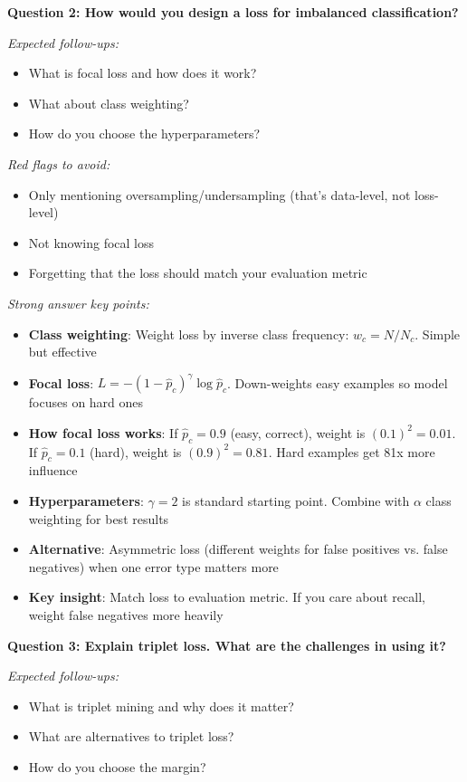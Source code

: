 \documentclass[../../main.tex]{subfiles}
\begin{document}
\begin{interviewquestions}
\vspace{0.5em}
\textbf{Question 2: How would you design a loss for imbalanced classification?}

\textit{Expected follow-ups:}
\begin{itemize}
    \item What is focal loss and how does it work?
    \item What about class weighting?
    \item How do you choose the hyperparameters?
\end{itemize}

\textit{Red flags to avoid:}
\begin{itemize}
    \item Only mentioning oversampling/undersampling (that's data-level, not loss-level)
    \item Not knowing focal loss
    \item Forgetting that the loss should match your evaluation metric
\end{itemize}

\textit{Strong answer key points:}
\begin{itemize}
    \item \textbf{Class weighting}: Weight loss by inverse class frequency: $w_c = N / N_c$. Simple but effective
    \item \textbf{Focal loss}: $L = -(1 - \hat{p}_c)^\gamma \log \hat{p}_c$. Down-weights easy examples so model focuses on hard ones
    \item \textbf{How focal loss works}: If $\hat{p}_c = 0.9$ (easy, correct), weight is $(0.1)^2 = 0.01$. If $\hat{p}_c = 0.1$ (hard), weight is $(0.9)^2 = 0.81$. Hard examples get 81x more influence
    \item \textbf{Hyperparameters}: $\gamma = 2$ is standard starting point. Combine with $\alpha$ class weighting for best results
    \item \textbf{Alternative}: Asymmetric loss (different weights for false positives vs. false negatives) when one error type matters more
    \item \textbf{Key insight}: Match loss to evaluation metric. If you care about recall, weight false negatives more heavily
\end{itemize}

\vspace{0.5em}
\textbf{Question 3: Explain triplet loss. What are the challenges in using it?}

\textit{Expected follow-ups:}
\begin{itemize}
    \item What is triplet mining and why does it matter?
    \item What are alternatives to triplet loss?
    \item How do you choose the margin?
\end{itemize}


\end{interviewquestions}
\end{document}
